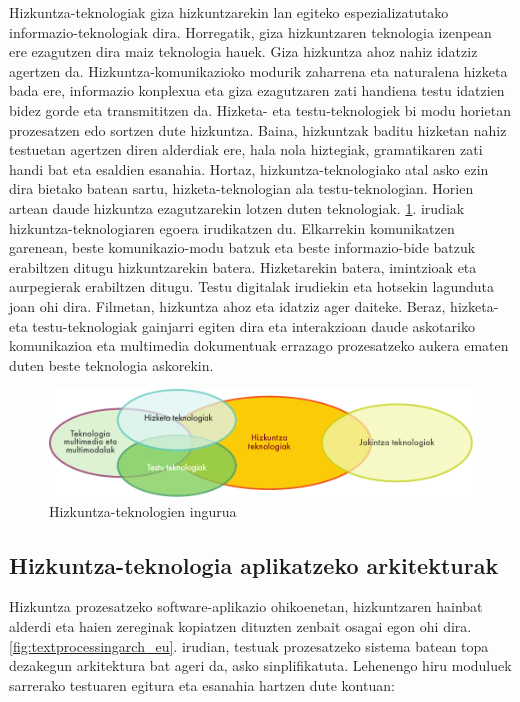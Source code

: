 \begin{multicols}{2}

  Hizkuntza-teknologiak giza hizkuntzarekin lan egiteko espezializatutako informazio-teknologiak dira. Horregatik, giza hizkuntzaren teknologia izenpean ere ezagutzen dira maiz teknologia hauek. Giza hizkuntza ahoz nahiz idatziz agertzen da. Hizkuntza-komunikazioko modurik zaharrena eta naturalena hizketa bada ere, informazio konplexua eta giza ezagutzaren zati handiena testu idatzien bidez gorde eta transmititzen da. Hizketa- eta testu-teknologiek bi modu horietan prozesatzen edo sortzen dute hizkuntza. Baina, hizkuntzak baditu hizketan nahiz testuetan agertzen diren alderdiak ere, hala nola hiztegiak, gramatikaren zati handi bat eta esaldien esanahia. Hortaz, hizkuntza-teknologiako atal asko ezin dira bietako batean sartu, hizketa-teknologian ala testu-teknologian. Horien artean daude hizkuntza ezagutzarekin lotzen duten teknologiak. \ref{fig:ltincontext_eu}. irudiak hizkuntza-teknologiaren egoera irudikatzen du. Elkarrekin komunikatzen garenean, beste komunikazio-modu batzuk eta beste informazio-bide batzuk erabiltzen ditugu hizkuntzarekin batera. Hizketarekin batera, imintzioak eta aurpegierak erabiltzen ditugu. Testu digitalak irudiekin eta hotsekin lagunduta joan ohi dira. Filmetan, hizkuntza ahoz eta idatziz ager daiteke. Beraz, hizketa- eta testu-teknologiak gainjarri egiten dira eta interakzioan daude askotariko komunikazioa eta multimedia dokumentuak errazago prozesatzeko aukera ematen duten beste teknologia askorekin. 
  
 
   \begin{figure}[htb]
  \center
  \includegraphics[width=\textwidth]{../_media/basque/language_technologies}
  \caption{Hizkuntza-teknologien ingurua}
  \label{fig:ltincontext_eu}
\end{figure}

\subsection[Hizkuntza-teknologia aplikatzeko arkitekturak]{Hizkuntza-teknologia aplikatzeko arkitekturak}
    Hizkuntza prozesatzeko software-aplikazio ohikoenetan, hizkuntzaren hainbat alderdi eta haien zereginak kopiatzen dituzten zenbait osagai egon ohi dira. \ref{fig:textprocessingarch_eu}. irudian, testuak prozesatzeko sistema batean topa dezakegun arkitektura bat ageri da, asko sinplifikatuta. Lehenengo hiru moduluek sarrerako testuaren egitura eta esanahia hartzen dute kontuan:


\end{multicols}
